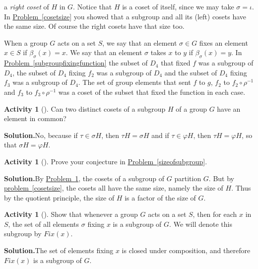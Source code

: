 \documentclass[10pt,]{book}
\theoremstyle{plain}
\theoremstyle{definition}
\newtheorem{activity}[project]{Activity}
\numberwithin{equation}{chapter}
\begin{document}
a \emph{right coset} of \(H\) in \(G\). Notice that \(H\) is a coset of itself, since we may take \(\sigma=\iota\). In \hyperref[cosetsize]{Problem~\ref{cosetsize}} you showed that a subgroup and all its (left) cosets have the same size. Of course the right cosets have that size too.%
\par
When a group \(G\) acts on a set \(S\), we say that an element \(\sigma \in
G\) fixes an element \(x\in S\) if \(\beta_{\sigma}(x) = x\). We say that an element \(\sigma\) takes \(x\) to \(y\) if \(\beta_{\sigma}(x) =y\). In \hyperref[subgroupfixingfunction]{Problem~\ref{subgroupfixingfunction}} the subset of \(D_4\) that fixed \(f\) was a subgroup of \(D_4\), the subset of \(D_4\) fixing \(f_2\) was a subgroup of \(D_4\) and the subset of \(D_4\) fixing \(f_3\) was a subgroup of \(D_4\). The set of group elements that sent \(f\) to \(g\), \(f_2\) to \(f_2\circ\rho^{-1}\) and \(f_3\) to \(f_3\circ\rho^{-1}\) was a coset of the subset that fixed the function in each case.%
\begin{activity}[]\label{cosetspartitionG}
Can two distinct cosets of a subgroup \(H\) of a group \(G\) have an element in common?%
\par\medskip\noindent%
\textbf{Solution.}\quad No, because if \(\tau\in \sigma H\), then \(\tau H =\sigma H\) and if \(\tau \in \varphi H\), then \(\tau H = \varphi H\), so that \(\sigma
H=\varphi H\).%
\end{activity}
\begin{activity}[]\label{activity-285}
Prove your conjecture in \hyperref[sizeofsubgroup]{Problem~\ref{sizeofsubgroup}}.%
\par\medskip\noindent%
\textbf{Solution.}\quad By \hyperref[cosetspartitionG]{Problem~\ref{cosetspartitionG}}, the cosets of a subgroup of \(G\) partition \(G\). But by \hyperref[cosetsize]{problem~\ref{cosetsize}}, the cosets all have the same size, namely the size of \(H\). Thus by the quotient principle, the size of \(H\) is a factor of the size of \(G\).%
\end{activity}
\begin{activity}[]\label{activity-286}
Show that whenever a group \(G\) acts on a set \(S\), then for each \(x\) in \(S\), the set of all elements \(\sigma\) fixing \(x\) is a subgroup of \(G\). We will denote this subgroup by \({ Fix}(x)\).%
\par\medskip\noindent%
\textbf{Solution.}\quad The set of elements fixing \(x\) is closed under composition, and therefore \({ Fix}(x)\) is a subgroup of \(G\).%
\end{activity}
\end{document}

